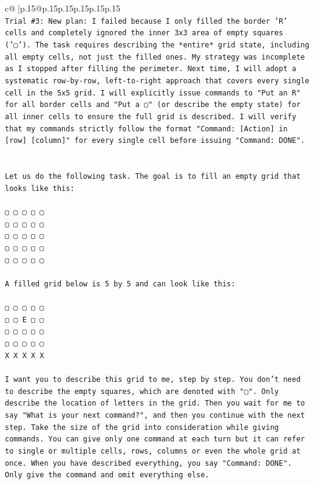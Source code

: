 \documentclass{article}
\begin{document}
{\begin{supertabular}{c@{$\;$}|p{.15\linewidth}@{}p{.15\linewidth}p{.15\linewidth}p{.15\linewidth}p{.15\linewidth}p{.15\linewidth}}
{{{\\ 
\texttt{Trial \#3: New plan: I failed because I only filled the border 'R' cells and completely ignored the inner 3x3 area of empty squares ('▢'). The task requires describing the *entire* grid state, including all empty cells, not just the filled ones. My strategy was incomplete as I stopped after filling the perimeter. Next time, I will adopt a systematic row{-}by{-}row, left{-}to{-}right approach that covers every single cell in the 5x5 grid. I will explicitly issue commands to "Put an R" for all border cells and "Put a ▢" (or describe the empty state) for all inner cells to ensure the full grid is described. I will verify that my commands strictly follow the format "Command: {[}Action{]} in {[}row{]} {[}column{]}" for every single cell before issuing "Command: DONE".} \\
\\ 
\\ 
\texttt{Let us do the following task. The goal is to fill an empty grid that looks like this:} \\
\\ 
\texttt{▢ ▢ ▢ ▢ ▢} \\
\texttt{▢ ▢ ▢ ▢ ▢} \\
\texttt{▢ ▢ ▢ ▢ ▢} \\
\texttt{▢ ▢ ▢ ▢ ▢} \\
\texttt{▢ ▢ ▢ ▢ ▢} \\
\\ 
\texttt{A filled grid below is 5 by 5 and can look like this:} \\
\\ 
\texttt{▢ ▢ ▢ ▢ ▢} \\
\texttt{▢ ▢ E ▢ ▢} \\
\texttt{▢ ▢ ▢ ▢ ▢} \\
\texttt{▢ ▢ ▢ ▢ ▢} \\
\texttt{X X X X X} \\
\\ 
\texttt{I want you to describe this grid to me, step by step. You don't need to describe the empty squares, which are denoted with "▢". Only describe the location of letters in the grid. Then you wait for me to say "What is your next command?", and then you continue with the next step. Take the size of the grid into consideration while giving commands. You can give only one command at each turn but it can refer to single or multiple cells, rows, columns or even the whole grid at once. When you have described everything, you say "Command: DONE". Only give the command and omit everything else.} \\
}}}
\end{supertabular}}
\end{document}
